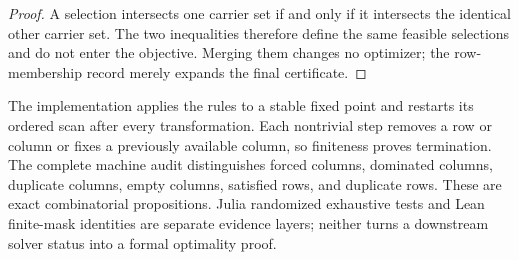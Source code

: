 \begin{proof}
A selection intersects one carrier set if and only if it intersects the
identical other carrier set. The two inequalities therefore define the same
feasible selections and do not enter the objective. Merging them changes no
optimizer; the row-membership record merely expands the final certificate.
\end{proof}

The implementation applies the rules to a stable fixed point and restarts its
ordered scan after every transformation. Each nontrivial step removes a row or
column or fixes a previously available column, so finiteness proves
termination. The complete machine audit distinguishes forced columns,
dominated columns, duplicate columns, empty columns, satisfied rows, and
duplicate rows. These are exact combinatorial propositions. Julia randomized
exhaustive tests and Lean finite-mask identities are separate evidence layers;
neither turns a downstream solver status into a formal optimality proof.
